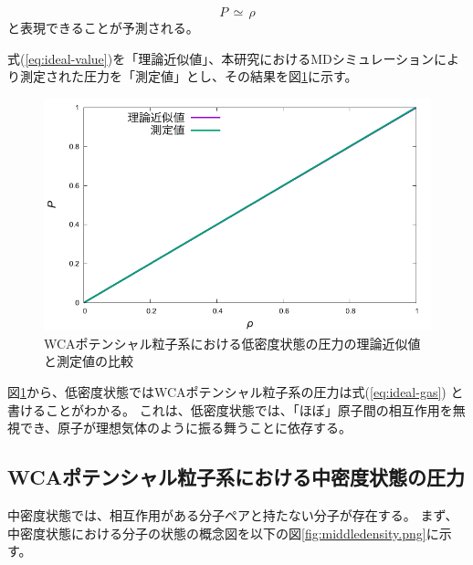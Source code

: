 \documentclass[titlepage]{jsreport}
\begin{document}
{{{\large
\begin{equation}
P\,{\simeq}\,{\rho} \label{eq:ideal-value}
\end{equation}
\normalsize
と表現できることが予測される。

式(\ref{eq:ideal-value})を「理論近似値」、本研究におけるMDシミュレーションにより測定された圧力を「測定値」とし、その結果を図\ref{fig:lowden_compare:den-pre}に示す。

\begin{figure}[htbp]
    \begin{center}
        \includegraphics[width=14cm]{fig/lowden_compare:den-pre.pdf}
    \end{center}
    \caption{WCAポテンシャル粒子系における低密度状態の圧力の理論近似値と測定値の比較}
    \label{fig:lowden_compare:den-pre}
\end{figure}

図\ref{fig:lowden_compare:den-pre}から、低密度状態ではWCAポテンシャル粒子系の圧力は式(\ref{eq:ideal-gas})
と書けることがわかる。
これは、低密度状態では、「ほぼ」原子間の相互作用を無視でき、原子が理想気体のように振る舞うことに依存する。

\newpage
\subsection{WCAポテンシャル粒子系における中密度状態の圧力}\label{results-subsec:WCA-press-middle-density}
中密度状態では、相互作用がある分子ペアと持たない分子が存在する。
まず、中密度状態における分子の状態の概念図を以下の図\ref{fig:middledensity.png}に示す。

}}}
\end{document}
